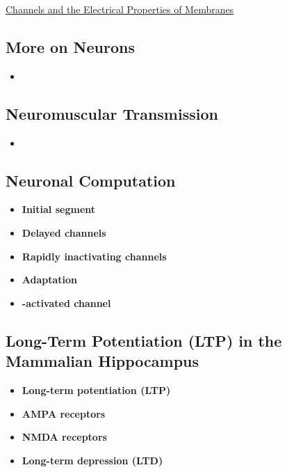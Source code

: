 \documentclass[12pt,letterpaper]{article}
\begin{document}
\begin{secbox}{\hyperlink{11}{Channels and the Electrical Properties of Membranes}}
{    \hypertarget{11.3.15}{\subsection*{More on Neurons}}
    \begin{itemize}
        \item
    \end{itemize}
    
    \hypertarget{11.3.16}{\subsection*{Neuromuscular Transmission}}
    \begin{itemize}
        \item 
    \end{itemize}
    
    \hypertarget{11.3.17}{\subsection*{Neuronal Computation}}
    \begin{itemize}
        \item \textbf{Initial segment}
        \item \textbf{Delayed  channels}
        \item \textbf{Rapidly inactivating  channels}
        \item \textbf{Adaptation}
        \item \textbf{-activated  channel}
    \end{itemize}
    
    \hypertarget{11.3.18}{\subsection*{Long-Term Potentiation (LTP) in the Mammalian Hippocampus}}
    \begin{itemize}
        \item \textbf{Long-term potentiation (LTP)}
        \item \textbf{AMPA receptors}
        \item \textbf{NMDA receptors}
        \item \textbf{Long-term depression (LTD)}
    \end{itemize}
    
}
\end{secbox}
\end{document}
